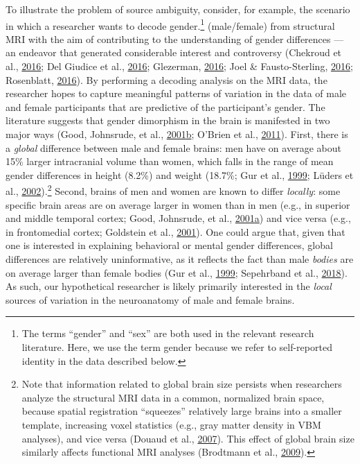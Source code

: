 \documentclass[11pt,american,a4paper,oneside,]{memoir} %
\let\rmarkdownfootnote\footnote%
\def\footnote{\protect\rmarkdownfootnote}
\begin{document}
To illustrate the problem of source ambiguity, consider, for example, the scenario in which a researcher wants to decode gender.\footnote{The terms ``gender'' and ``sex'' are both used in the relevant research literature. Here, we use the term gender because we refer to self-reported identity in the data described below.} (male/female) from structural MRI with the aim of contributing to the understanding of gender differences --- an endeavor that generated considerable interest and controversy (Chekroud et al., \protect\hyperlink{ref-Chekroud2016-tc}{2016}; Del Giudice et al., \protect\hyperlink{ref-Del_Giudice2016-ns}{2016}; Glezerman, \protect\hyperlink{ref-Glezerman2016-xl}{2016}; Joel \& Fausto-Sterling, \protect\hyperlink{ref-Joel2016-uo}{2016}; Rosenblatt, \protect\hyperlink{ref-Rosenblatt2016-oy}{2016}). By performing a decoding analysis on the MRI data, the researcher hopes to capture meaningful patterns of variation in the data of male and female participants that are predictive of the participant's gender. The literature suggests that gender dimorphism in the brain is manifested in two major ways (Good, Johnsrude, et al., \protect\hyperlink{ref-Good2001-kv}{2001}\protect\hyperlink{ref-Good2001-kv}{b}; O'Brien et al., \protect\hyperlink{ref-OBrien2011-lj}{2011}). First, there is a \emph{global} difference between male and female brains: men have on average about 15\% larger intracranial volume than women, which falls in the range of mean gender differences in height (8.2\%) and weight (18.7\%; Gur et al., \protect\hyperlink{ref-Gur1999-qj}{1999}; Lüders et al., \protect\hyperlink{ref-Luders2002-ms}{2002}).\footnote{Note that information related to global brain size persists when researchers analyze the structural MRI data in a common, normalized brain space, because spatial registration ``squeezes'' relatively large brains into a smaller template, increasing voxel statistics (e.g., gray matter density in VBM analyses), and vice versa (Douaud et al., \protect\hyperlink{ref-Douaud2007-sw}{2007}). This effect of global brain size similarly affects functional MRI analyses (Brodtmann et al., \protect\hyperlink{ref-brodtmann2009regional}{2009}).} Second, brains of men and women are known to differ \emph{locally}: some specific brain areas are on average larger in women than in men (e.g., in superior and middle temporal cortex; Good, Johnsrude, et al., \protect\hyperlink{ref-Good2001-ak}{2001}\protect\hyperlink{ref-Good2001-ak}{a}) and vice versa (e.g., in frontomedial cortex; Goldstein et al., \protect\hyperlink{ref-Goldstein2001-dy}{2001}). One could argue that, given that one is interested in explaining behavioral or mental gender differences, global differences are relatively uninformative, as it reflects the fact than male \emph{bodies} are on average larger than female bodies (Gur et al., \protect\hyperlink{ref-Gur1999-qj}{1999}; Sepehrband et al., \protect\hyperlink{ref-Sepehrband2018-dy}{2018}). As such, our hypothetical researcher is likely primarily interested in the \emph{local} sources of variation in the neuroanatomy of male and female brains.
\end{document}
